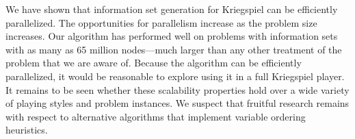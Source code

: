 \documentclass[times, 10pt,twocolumn]{article}
\begin{document}
%

We have shown that information set generation for Kriegspiel can be efficiently
parallelized.  The opportunities for parallelism increase as the problem size
increases.  Our algorithm has performed well on problems with information sets
with as many as 65 million nodes---much larger than any other treatment of the
problem that we are aware of.  Because the algorithm can be efficiently
parallelized, it would be reasonable to explore using it in a full Kriegspiel
player.  It remains to be seen whether these scalability properties hold over a
wide variety of playing styles and problem instances.  We suspect that fruitful
research remains with respect to alternative algorithms that implement variable
ordering heuristics.
\end{document}
